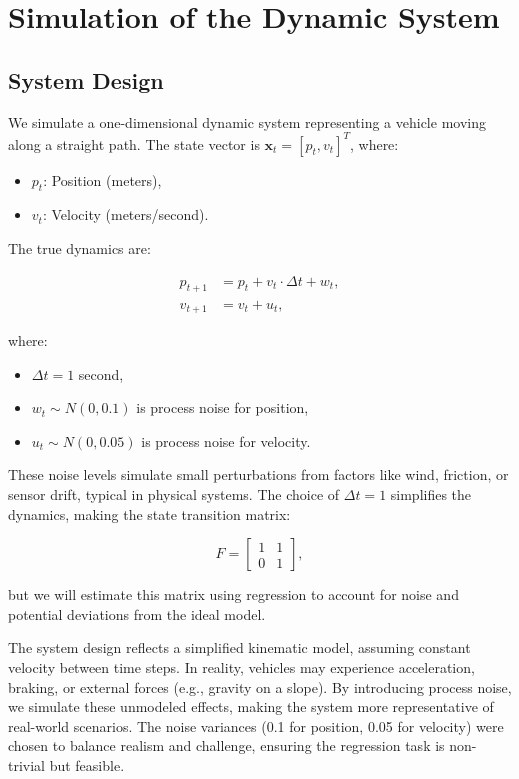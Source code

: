 \documentclass[12pt]{article}
\begin{document}
\section{Simulation of the Dynamic System}
\label{sec:simulation}

\subsection{System Design}
\label{subsec:system_design}

We simulate a one-dimensional dynamic system representing a vehicle moving along a straight path. The state vector is \( \mathbf{x}_t = [p_t, v_t]^T \), where:
\begin{itemize}
    \item \( p_t \): Position (meters),
    \item \( v_t \): Velocity (meters/second).
\end{itemize}

The true dynamics are:

\begin{align}
    p_{t+1} &= p_t + v_t \cdot \Delta t + w_t, \label{eq:sim_position} \\
    v_{t+1} &= v_t + u_t, \label{eq:sim_velocity}
\end{align}

where:
\begin{itemize}
    \item \( \Delta t = 1 \) second,
    \item \( w_t \sim N(0, 0.1) \) is process noise for position,
    \item \( u_t \sim N(0, 0.05) \) is process noise for velocity.
\end{itemize}

These noise levels simulate small perturbations from factors like wind, friction, or sensor drift, typical in physical systems. The choice of \( \Delta t = 1 \) simplifies the dynamics, making the state transition matrix:

\begin{equation}
    F = \begin{bmatrix} 1 & 1 \\ 0 & 1 \end{bmatrix},
    \label{eq:sim_F}
\end{equation}

but we will estimate this matrix using regression to account for noise and potential deviations from the ideal model.

The system design reflects a simplified kinematic model, assuming constant velocity between time steps. In reality, vehicles may experience acceleration, braking, or external forces (e.g., gravity on a slope). By introducing process noise, we simulate these unmodeled effects, making the system more representative of real-world scenarios. The noise variances (0.1 for position, 0.05 for velocity) were chosen to balance realism and challenge, ensuring the regression task is non-trivial but feasible.
\end{document}
